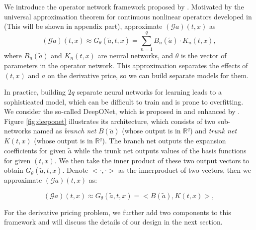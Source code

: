 \documentclass[11pt,a4paper]{article}
\theoremstyle{remark}
\begin{document}
\begin{itemize}
\begin{enumerate}
        \end{enumerate}
        
    \end{itemize}
    
    We introduce the operator network framework proposed by \cite{lu2021learning}. Motivated by the universal approximation theorem for continuous nonlinear operators developed in \cite{chen1995universal} (This will be shown in appendix part), \cite{lu2021learning} approximate $(\mathcal{G}a)(t, x)$ as
    \begin{equation}
    	(\mathcal{G}a)(t, x) \approx G_{\theta}(\tilde{a}, t, x) = \sum_{n=1}^{q} B_n(\tilde{a})\cdot K_n(t, x),\label{eq:G-rep-approx}
    \end{equation}
    where $B_n(\tilde{a})$ and $K_n(t, x)$ are neural networks, and $\theta$ is the vector of parameters in the operator network. This approximation separates the effects of $(t,x)$ and $a$ on the derivative price, so we can build separate models for them.  
    
    In practice, building $2q$ separate neural networks for learning leads to a sophisticated model, which can be difficult to train and is prone to overfitting. We consider the so-called DeepONet, which is proposed in \cite{lu2021learning} and enhanced by \cite{tan2022enhanced}. Figure \ref{fig:deeponet} illustrates its architecture, which consists of two sub-networks named as \emph{branch net} $B(\tilde{a})$ (whose output is in $\mathbb{R}^q$) and \emph{trunk net}  $K(t, x)$ (whose output is in $\mathbb{R}^q$). The branch net outputs the  expansion coefficients for given $\tilde{a}$ while the trunk net outputs values of the basis functions for given $(t,x)$. We then take the inner product of these two output vectors to obtain $G_{\theta}(\tilde{a}, t, x)$. Denote $<\cdot, \cdot>$ as the innerproduct of two vectors, then we approximate $(\mathcal{G}a)(t, x)$ as:
    
    \begin{equation}
    (\mathcal{G}a)(t, x) \approx G_{\theta}(\tilde{a}, t, x) =  <B(\tilde{a}), K(t, x)>,\label{eq:G-rep}
    \end{equation}
    
    For the derivative pricing problem, we further add two components to this framework and will discuss the details of our design in the next section. 
    
\end{document}

